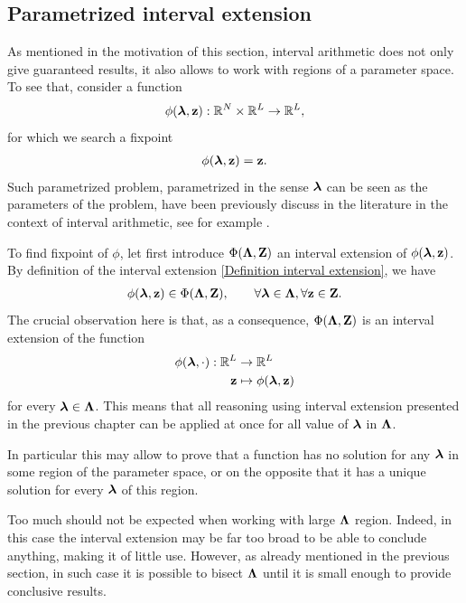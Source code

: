 \documentclass[
11pt, %
english, %
singlespacing, %
nolistspacing, %
liststotoc, %
headsepline, %
]{MastersDoctoralThesis} %
\begin{document}

\subsection{Parametrized interval extension}
\label{Section: Parametrized interval extension}

As mentioned in the motivation of this section, interval arithmetic does not only give guaranteed results, it also allows to work with regions of a parameter space. To see that, consider a function
\begin{align}
	\phi(\boldsymbol{\mathrm{\lambda}}, \boldsymbol{\mathrm{z}}) : \mathbb{R}^N \times \mathbb{R}^L \rightarrow \mathbb{R}^L,
\end{align}
for which we search a fixpoint
\begin{align}
	\phi(\boldsymbol{\mathrm{\lambda}}, \boldsymbol{\mathrm{z}}) = \boldsymbol{\mathrm{z}}.
\end{align}
Such parametrized problem, parametrized in the sense $\boldsymbol{\mathrm{\lambda}}$ can be seen as the parameters of the problem, have been previously discuss in the literature in the context of interval arithmetic, see for example \cite{neumaier1988enclosure}.

To find fixpoint of $\phi$, let first introduce $\Phi(\boldsymbol{\mathrm{\Lambda}}, \boldsymbol{\mathrm{Z}})$ an interval extension of $\phi(\boldsymbol{\mathrm{\lambda}}, \boldsymbol{\mathrm{z}})$. By definition of the interval extension \eqref{Definition interval extension}, we have
\begin{align}
	\phi(\boldsymbol{\mathrm{\lambda}}, \boldsymbol{\mathrm{z}}) \in \Phi(\boldsymbol{\mathrm{\Lambda}}, \boldsymbol{\mathrm{Z}}), \qquad \forall \boldsymbol{\mathrm{\lambda}} \in \boldsymbol{\mathrm{\Lambda}}, \forall \boldsymbol{\mathrm{z}} \in \boldsymbol{\mathrm{Z}}.
\end{align}
The crucial observation here is that, as a consequence, $\Phi(\boldsymbol{\mathrm{\Lambda}}, \boldsymbol{\mathrm{Z}})$ is an interval extension of the function
\begin{align}
	\phi(\boldsymbol{\mathrm{\lambda}}, \cdot) : \mathbb{R}^L &\rightarrow \mathbb{R}^L \\
	\boldsymbol{\mathrm{z}} &\mapsto \phi(\boldsymbol{\mathrm{\lambda}}, \boldsymbol{\mathrm{z}})
\end{align}
for every $\boldsymbol{\mathrm{\lambda}} \in \boldsymbol{\mathrm{\Lambda}}$. This means that all reasoning using interval extension presented in the previous chapter can be applied at once for all value of $\boldsymbol{\mathrm{\lambda}}$ in $\boldsymbol{\mathrm{\Lambda}}$.

In particular this may allow to prove that a function has no solution for any $\boldsymbol{\mathrm{\lambda}}$ in some region of the parameter space, or on the opposite that it has a unique solution for every $\boldsymbol{\mathrm{\lambda}}$ of this region.

Too much should not be expected when working with large $\boldsymbol{\mathrm{\Lambda}}$ region. Indeed, in this case the interval extension may be far too broad to be able to conclude anything, making it of little use. However, as already mentioned in the previous section, in such case it is possible to bisect $\boldsymbol{\mathrm{\Lambda}}$ until it is small enough to provide conclusive results.
\end{document}
